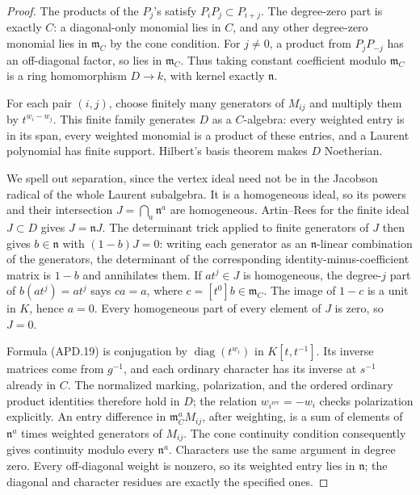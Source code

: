 \documentclass[11pt,a4paper]{article}
\numberwithin{equation}{section}
\theoremstyle{remark}\newtheorem{remark}[theorem]{Remark}
\begin{document}
\begin{proof}
The products of the \(P_j\)'s satisfy \(P_iP_j\subset P_{i+j}\).
The degree-zero part is exactly \(C\): a diagonal-only monomial
lies in \(C\), and any other degree-zero monomial lies in
\(\mathfrak m_C\) by the cone condition.  For \(j\ne0\),
a product from \(P_jP_{-j}\) has an off-diagonal factor, so
lies in \(\mathfrak m_C\).  Thus taking constant coefficient
modulo \(\mathfrak m_C\) is a ring homomorphism
\(D\to k\), with kernel exactly \(\mathfrak n\).

For each pair \((i,j)\), choose finitely many generators of
\(M_{ij}\) and multiply them by \(t^{w_i-w_j}\).  This finite
family generates \(D\) as a \(C\)-algebra: every weighted
entry is in its span, every weighted monomial is a product of
these entries, and a Laurent polynomial has finite support.
Hilbert's basis theorem makes \(D\) Noetherian.

We spell out separation, since the vertex ideal need not be in
the Jacobson radical of the whole Laurent subalgebra.  It is a
homogeneous ideal, so its powers and their intersection
\(J=\bigcap_a\mathfrak n^a\) are homogeneous.  Artin--Rees
for the finite ideal \(J\subset D\) gives \(J=\mathfrak nJ\).
The determinant trick applied to finite generators of \(J\)
then gives \(b\in\mathfrak n\) with \((1-b)J=0\): writing
each generator as an \(\mathfrak n\)-linear combination of
the generators, the determinant of the corresponding
identity-minus-coefficient matrix is \(1-b\) and annihilates
them.  If \(at^j\in J\) is homogeneous, the degree-\(j\)
part of \(b(at^j)=at^j\) says \(ca=a\), where
\(c=[t^0]b\in\mathfrak m_C\).  The image of \(1-c\) is
a unit in \(K\), hence \(a=0\).  Every homogeneous part of
every element of \(J\) is zero, so \(J=0\).

Formula (APD.19) is conjugation by
\(\operatorname{diag}(t^{w_i})\) in \(K[t,t^{-1}]\).
Its inverse matrices come from \(g^{-1}\), and each ordinary
character has its inverse at \(s^{-1}\) already in \(C\).
The normalized marking, polarization, and the ordered ordinary
product identities therefore hold in \(D\); the relation
\(w_{i^{\mathrm{rev}}}=-w_i\) checks polarization explicitly.
An entry difference in \(\mathfrak m_C^aM_{ij}\), after
weighting, is a sum of elements of \(\mathfrak n^a\) times
weighted generators of \(M_{ij}\).  The cone continuity
condition consequently gives continuity modulo every
\(\mathfrak n^a\).  Characters use the same argument in
degree zero.  Every off-diagonal weight is nonzero, so its
weighted entry lies in \(\mathfrak n\); the diagonal and
character residues are exactly the specified ones.
\end{proof}
\end{document}
